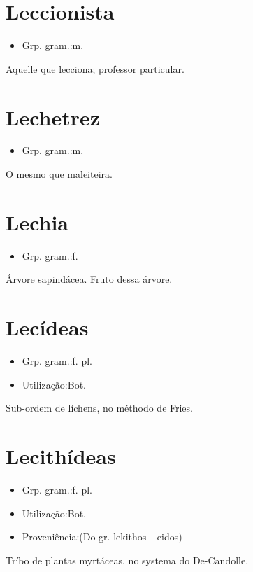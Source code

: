 \section{Leccionista}
\begin{itemize}
\item {Grp. gram.:m.}
\end{itemize}
Aquelle que lecciona; professor particular.
\section{Lechetrez}
\begin{itemize}
\item {Grp. gram.:m.}
\end{itemize}
O mesmo que \textunderscore maleiteira\textunderscore .
\section{Lechia}
\begin{itemize}
\item {Grp. gram.:f.}
\end{itemize}
Árvore sapindácea.
Fruto dessa árvore.
\section{Lecídeas}
\begin{itemize}
\item {Grp. gram.:f. pl.}
\end{itemize}
\begin{itemize}
\item {Utilização:Bot.}
\end{itemize}
Sub-ordem de líchens, no méthodo de Fries.
\section{Lecithídeas}
\begin{itemize}
\item {Grp. gram.:f. pl.}
\end{itemize}
\begin{itemize}
\item {Utilização:Bot.}
\end{itemize}
\begin{itemize}
\item {Proveniência:(Do gr. \textunderscore lekithos\textunderscore  + \textunderscore eidos\textunderscore )}
\end{itemize}
Tríbo de plantas myrtáceas, no systema do De-Candolle.
